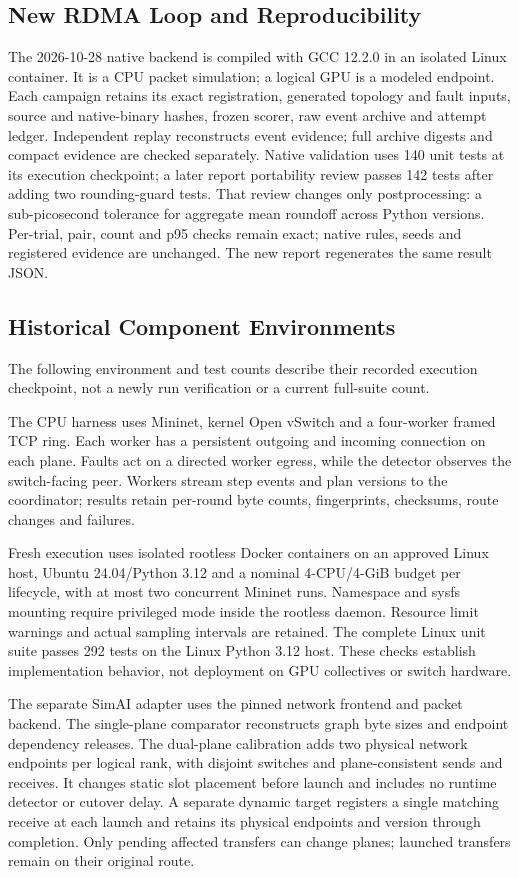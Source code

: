 \documentclass[sigconf]{acmart}
\begin{document}
\subsection{New RDMA Loop and Reproducibility}
The 2026-10-28 native backend is compiled with GCC 12.2.0 in an isolated
Linux container. It is a CPU packet simulation; a logical GPU is a modeled
endpoint. Each campaign retains its exact registration, generated topology
and fault inputs, source and native-binary hashes, frozen scorer, raw event
archive and attempt ledger. Independent replay reconstructs event evidence;
full archive digests and compact evidence are checked separately. Native
validation uses 140 unit tests at its execution checkpoint; a later report
portability review passes 142 tests after adding two rounding-guard tests.
That review changes only postprocessing: a sub-picosecond tolerance for
aggregate mean roundoff across Python versions. Per-trial, pair, count and
p95 checks remain exact; native rules, seeds and registered evidence are
unchanged. The new report regenerates the same result JSON.

\subsection{Historical Component Environments}
The following environment and test counts describe their recorded execution
checkpoint, not a newly run verification or a current full-suite count.

The CPU harness uses Mininet, kernel Open vSwitch and a four-worker
framed TCP ring. Each worker has a persistent outgoing and incoming
connection on each plane. Faults act on a directed worker egress, while
the detector observes the switch-facing peer. Workers stream step events
and plan versions to the coordinator; results retain per-round byte
counts, fingerprints, checksums, route changes and failures.

Fresh execution uses isolated rootless Docker containers on an approved
Linux host, Ubuntu 24.04/Python 3.12 and a nominal 4-CPU/4-GiB budget per
lifecycle, with at most two concurrent Mininet runs. Namespace and sysfs
mounting require privileged mode inside the rootless daemon. Resource
limit warnings and actual sampling intervals are retained. The complete
Linux unit suite passes 292 tests on the Linux Python 3.12 host. These checks establish implementation
behavior, not deployment on GPU collectives or switch hardware.

The separate SimAI adapter uses the pinned network frontend and packet
backend. The single-plane comparator reconstructs graph byte sizes and
endpoint dependency releases. The dual-plane calibration adds two
physical network endpoints per logical rank, with disjoint switches and
plane-consistent sends and receives. It changes static slot placement before launch and includes no runtime
detector or cutover delay. A separate dynamic target registers a single
matching receive at each launch and retains its physical endpoints and
version through completion. Only pending affected transfers can change
planes; launched transfers remain on their original route.
\end{document}

